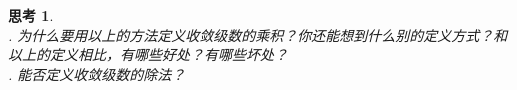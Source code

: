 \documentclass[12pt,UTF8]{ctexbook}
\newtheorem{sk}{思考}[section]
\begin{document}





\begin{sk}
    \mbox{} \\
    . 为什么要用以上的方法定义收敛级数的乘积？你还能想到什么别的定义方式？和以上的定义相比，有哪些好处？有哪些坏处？\\
    . 能否定义收敛级数的除法？
\end{sk}
\end{document}
